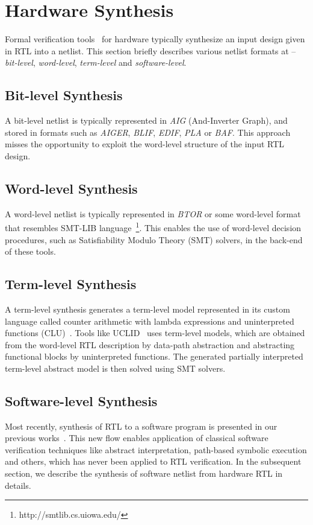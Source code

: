 \section{Hardware Synthesis}\label{sec:abstraction}
%
Formal verification tools~\cite{abc,DBLP:conf/fmcad/BradleyM07,vis} for 
hardware typically synthesize an input design given in RTL into a netlist.  
This section briefly describes various netlist formats at -- \emph{bit-level},
\emph{word-level}, \emph{term-level} and \emph{software-level}.  
%
%
\subsection{Bit-level Synthesis}
A bit-level netlist is typically represented in \emph{AIG} (And-Inverter Graph), 
and stored in formats such as \emph{AIGER}, \emph{BLIF}, 
\emph{EDIF}, \emph{PLA} or \emph{BAF}.  This approach misses 
the opportunity to exploit the word-level structure of the 
input RTL design.  

\subsection{Word-level Synthesis}
A word-level netlist is typically represented in \emph{BTOR} or 
some word-level format that resembles SMT-LIB language~\footnote{http://smtlib.cs.uiowa.edu/}.  
This enables the use of word-level decision procedures, such as 
Satisfiability Modulo Theory (SMT) solvers, in the back-end of these tools.  

\subsection{Term-level Synthesis}
A term-level synthesis generates a term-level model represented 
in its custom language called counter arithmetic with lambda 
expressions and uninterpreted functions (CLU)~\cite{uclid}.  Tools 
like UCLID~\cite{uclid} uses term-level models, which are obtained 
from the word-level RTL description by data-path abstraction and 
abstracting functional blocks by uninterpreted functions.  The 
generated partially interpreted term-level abstract model is then 
solved using SMT solvers.  

\subsection{Software-level Synthesis}
Most recently, synthesis of RTL to a software program is presented 
in our previous works~\cite{mkm2015,mtk2016}.  This new flow enables application 
of classical software verification techniques like abstract interpretation, path-based 
symbolic execution and others, which has never been applied to RTL verification.  
In the subsequent section, we describe the synthesis of software netlist 
from hardware RTL in details.     
